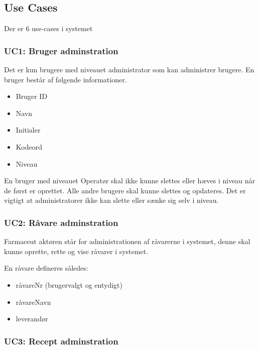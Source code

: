 \documentclass[a4paper]{article}
\begin{document}
\subsection{Use Cases} %

Der er 6 use-cases i systemet

\subsubsection{UC1: Bruger adminstration} %

Det er kun brugere med niveauet administrator som kan administrer brugere. En bruger består af følgende informationer.

\begin{itemize}
  \item Bruger ID
  \item Navn
  \item Initialer
  \item Kodeord
  \item Niveau
\end{itemize}

En bruger med niveauet Operatør skal ikke kunne slettes eller hæves i niveau når de først er oprettet.  Alle andre brugere skal kunne slettes og opdateres. Det er vigtigt at administratorer ikke kan slette eller sænke sig selv i niveau.   


\subsubsection{UC2: Råvare adminstration} %

Farmaceut aktøren står for administrationen af råvarerne i systemet, denne skal kunne oprette, rette og vise råvarer i systemet.

En råvare defineres således:

\begin{itemize}
  \item råvareNr (brugervalgt og entydigt)
  \item råvareNavn
  \item leverandør
\end{itemize}


\subsubsection{UC3: Recept adminstration} %
\end{document}
